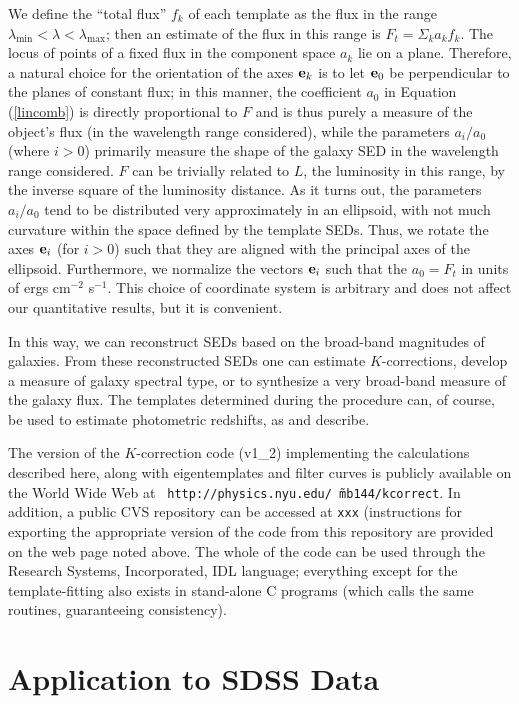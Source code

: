 \documentclass[10pt,preprint]{aastex}
\newcommand{\vv}[1]{{\bf #1}}
\begin{document}
We define the ``total flux'' $f_k$ of each template as the flux in the
range $\lambda_{\mathrm{min}}<\lambda<\lambda_{\mathrm{max}}$; then an
estimate of the flux in this range is $F_{{t}}=\Sigma_k a_k f_k$. The
locus of points of a fixed flux in the component space $a_k$ lie on a
plane. Therefore, a natural choice for the orientation of the axes
$\vv{e}_k$ is to let $\vv{e}_0$ be perpendicular to the planes of
constant flux; in this manner, the coefficient $a_0$ in Equation
(\ref{lincomb}) is directly proportional to $F$ and is thus purely a
measure of the object's flux (in the wavelength range considered),
while the parameters $a_i/a_0$ (where $i>0$) primarily measure the
shape of the galaxy SED in the wavelength range considered. $F$ can be
trivially related to $L$, the luminosity in this range, by the inverse
square of the luminosity distance.  As it turns out, the parameters
$a_i/a_0$ tend to be distributed very approximately in an ellipsoid,
with not much curvature within the space defined by the template
SEDs. Thus, we rotate the axes $\vv{e}_i$ (for $i>0$) such that they
are aligned with the principal axes of the ellipsoid. Furthermore, we
normalize the vectors $\vv{e}_i$ such that the $a_0=F_t$ in units of
ergs cm$^{-2}$ s$^{-1}$. This choice of coordinate system is
arbitrary and does not affect our quantitative results, but it is
convenient.

In this way, we can reconstruct SEDs based on the broad-band
magnitudes of galaxies. From these reconstructed SEDs one can estimate
$K$-corrections, develop a measure of galaxy spectral type, or to
synthesize a very broad-band measure of the galaxy flux.  The
templates determined during the procedure can, of course, be used to
estimate photometric redshifts, as \citet{csabai00a} and
\citet{budavari00a} describe.

The version of the $K$-correction code (v1\_2) implementing the
calculations described here, along with eigentemplates and filter
curves is publicly available on the World Wide Web at {\tt
http://physics.nyu.edu/\~\ mb144/kcorrect}. In addition, a public CVS
repository can be accessed at {\tt xxx} (instructions for exporting
the appropriate version of the code from this repository are provided
on the web page noted above. The whole of the code can be used through
the Research Systems, Incorporated, IDL language; everything except
for the template-fitting also exists in stand-alone C programs (which
calls the same routines, guaranteeing consistency).

\section{Application to SDSS Data}
\label{data}
\end{document}

